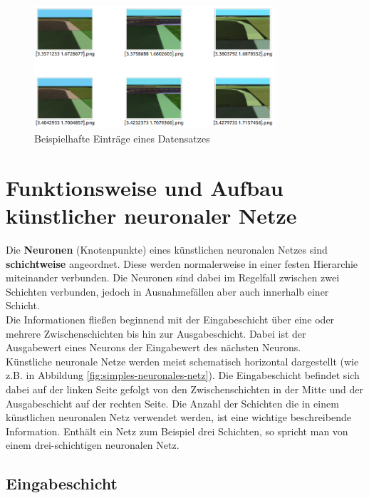 \begin{figure}[H]
	\centering
	\includegraphics[width=0.8\textwidth]{kapitel3/images/dataset_entries_example.png}
	\caption{Beispielhafte Einträge eines Datensatzes}
	\label{fig:data_entry_example}
\end{figure}

\section{Funktionsweise und Aufbau künstlicher neuronaler Netze}

Die \textbf{Neuronen} (Knotenpunkte) eines künstlichen neuronalen Netzes sind \textbf{schichtweise} angeordnet. Diese werden normalerweise in einer festen Hierarchie miteinander verbunden. Die Neuronen sind dabei im Regelfall zwischen zwei Schichten verbunden, jedoch in Ausnahmefällen aber auch innerhalb einer Schicht. \cite{jaai} \\

Die Informationen fließen beginnend mit der Eingabeschicht über eine oder mehrere Zwischenschichten bis hin zur Ausgabeschicht. Dabei ist der Ausgabewert eines Neurons der Eingabewert des nächsten Neurons. \cite{jaai} \\

Künstliche neuronale Netze werden meist schematisch horizontal dargestellt (wie z.B. in Abbildung \ref{fig:simples-neuronales-netz}). Die Eingabeschicht befindet sich dabei auf der linken Seite  gefolgt von den Zwischenschichten in der Mitte und der Ausgabeschicht auf der rechten Seite.
Die Anzahl der Schichten die in einem künstlichen neuronalen Netz verwendet werden, ist eine wichtige beschreibende Information. Enthält ein Netz zum Beispiel drei Schichten, so spricht man von einem drei-schichtigen neuronalen Netz. \cite{jaai}

\subsection{Eingabeschicht}
	
